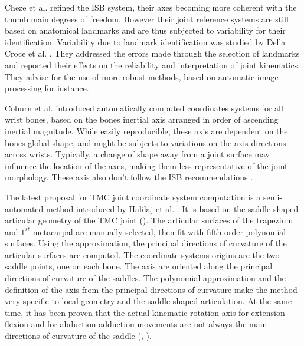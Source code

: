 Cheze et al. \cite{cheze_2009_joint} refined the ISB system, their axes becoming more coherent with the thumb main degrees of freedom. However their joint reference systems are still based on anatomical landmarks and are thus subjected to variability for their identification. Variability due to landmark identification was studied by Della Croce et al. \cite{della_2005_human}. They addressed the errors made through the selection of landmarks and reported their effects on the reliability and interpretation of joint kinematics. They advise for the use of more robust methods, based on automatic image processing for instance.

Coburn et al. \cite{coburn_2007_coordinate} introduced automatically computed coordinates systems for all wrist bones, based on the bones inertial axis arranged in order of ascending inertial magnitude. While easily reproducible, these axis are dependent on the bones global shape, and might be subjects to variations on the axis directions across wrists. Typically, a change of shape away from a joint surface may influence the location of the axes, making them less representative of the joint morphology. These axis also don't follow the ISB recommendations \cite{wu_1995_isb}. 

The latest proposal for TMC joint coordinate system computation is a semi-automated method introduced by Halilaj et al. \cite{halilaj_2013_thumb}. It is based on the saddle-shaped articular geometry of the TMC joint (). The articular surfaces of the trapezium and $1^{st}$ metacarpal are manually selected, then fit with fifth order polynomial surfaces. Using the approximation, the principal directions of curvature of the articular surfaces are computed. The coordinate systems origins are the two saddle points, one on each bone. The axis are oriented along the principal directions of curvature of the saddles. The polynomial approximation and the definition of the axis from the principal directions of curvature make the method very specific to local geometry and the saddle-shaped articulation. At the same time, it has been proven that the actual kinematic rotation axis for extension-flexion and for abduction-adduction movements are not always the main directions of curvature of the saddle (\cite{hollister_1992_axes}, \cite{crisco_2015_vivo}).


